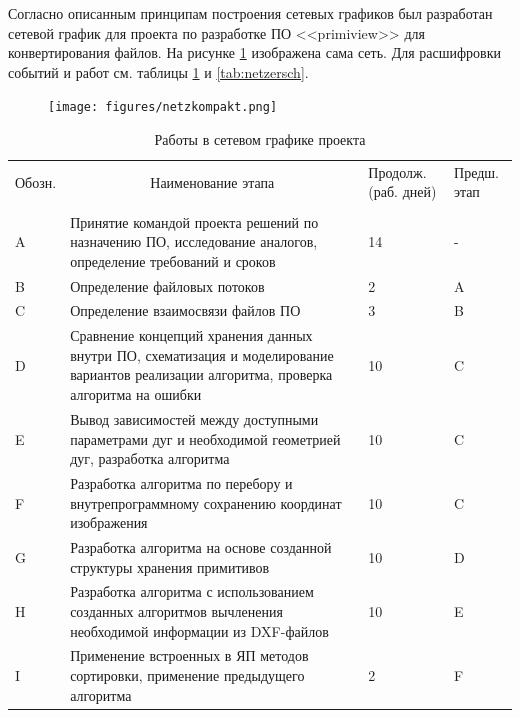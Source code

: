 Согласно описанным принципам построения сетевых графиков был разработан сетевой график для проекта по разработке ПО <<primiview>> для конвертирования файлов. На рисунке \ref{fig:netzkompakt} изображена сама сеть. Для расшифровки событий и работ см. таблицы \ref{tab:netzarbeiten} и \ref{tab:netzersch}.

\begin{figure}[H]
	\centering
	\texttt{[image: figures/netzkompakt.png]}
	\label{fig:netzkompakt}
\end{figure}

\begin{longtable}{|m{}|p{}|m{}|m{}|}
	\caption{Работы в сетевом графике проекта}
	\label{tab:netzarbeiten}
	\centering
	\tabularnewline
	\hline
	\multicolumn{1}{|m{0.10\textwidth}|}{Обозн.}&\multicolumn{1}{c|}{Наименование этапа}&\multicolumn{1}{m{0.12\textwidth}|}{Продолж.\newline (раб. дней)}&\multicolumn{1}{m{0.10\textwidth}|}{Предш. этап}\\
	\hline \endfirsthead
	\subcaption{Продолжение таблицы~\ref{tab:netzarbeiten}}\\
	\hline \endhead
	\subcaption{Продолжение на след. стр.}
	\endfoot
	\endlastfoot
	A&Принятие командой проекта решений по назначению ПО, исследование аналогов, определение требований и сроков&14&-\\ \hline
	B&Определение файловых потоков&2&A\\ \hline
	C&Определение взаимосвязи файлов ПО&3&B\\ \hline
	D&Сравнение концепций хранения данных внутри ПО, схематизация и моделирование вариантов реализации алгоритма, проверка алгоритма на ошибки&10&C\\ \hline
	E&Вывод зависимостей между доступными параметрами дуг и необходимой геометрией дуг, разработка алгоритма&10&C\\ \hline
	F&Разработка алгоритма по перебору и внутрепрограммному сохранению координат изображения&10&C\\ \hline
	G&Разработка алгоритма на основе созданной структуры хранения примитивов&10&D\\ \hline
	H&Разработка алгоритма с использованием созданных алгоритмов вычленения необходимой информации из DXF-файлов&10&E\\ \hline
	I&Применение встроенных в ЯП методов сортировки, применение предыдущего алгоритма&2&F\\ \hline

\end{longtable}
